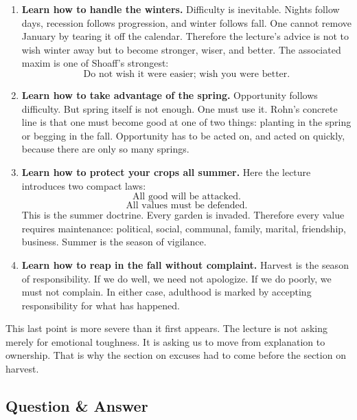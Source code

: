 \begin{enumerate}
\item \textbf{Learn how to handle the winters.} Difficulty is inevitable. Nights follow days, recession follows progression, and winter follows fall. One cannot remove January by tearing it off the calendar. Therefore the lecture's advice is not to wish winter away but to become stronger, wiser, and better. The associated maxim is one of Shoaff's strongest:
\begin{equation}
\text{Do not wish it were easier; wish you were better.}
\end{equation}

\item \textbf{Learn how to take advantage of the spring.} Opportunity follows difficulty. But spring itself is not enough. One must use it. Rohn's concrete line is that one must become good at one of two things: planting in the spring or begging in the fall. Opportunity has to be acted on, and acted on quickly, because there are only so many springs.

\item \textbf{Learn how to protect your crops all summer.} Here the lecture introduces two compact laws:
\begin{equation}
\text{All good will be attacked.}
\end{equation}
\begin{equation}
\text{All values must be defended.}
\end{equation}
This is the summer doctrine. Every garden is invaded. Therefore every value requires maintenance: political, social, communal, family, marital, friendship, business. Summer is the season of vigilance.

\item \textbf{Learn how to reap in the fall without complaint.} Harvest is the season of responsibility. If we do well, we need not apologize. If we do poorly, we must not complain. In either case, adulthood is marked by accepting responsibility for what has happened.
\end{enumerate}

This last point is more severe than it first appears. The lecture is not asking merely for emotional toughness. It is asking us to move from explanation to ownership. That is why the section on excuses had to come before the section on harvest.

\subsection{Question \& Answer}

